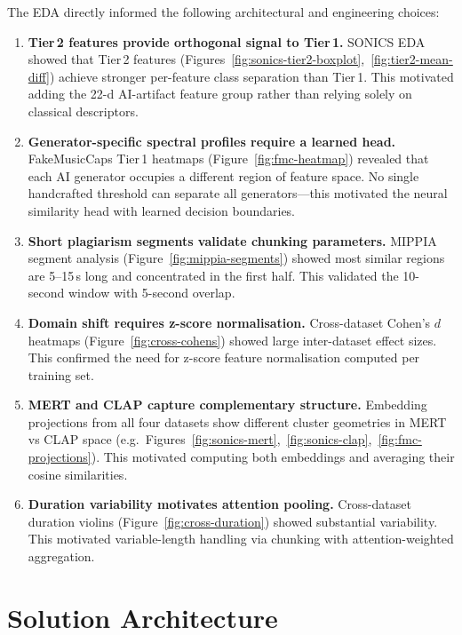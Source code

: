 \documentclass[11pt,a4paper]{article}
\begin{document}
The EDA directly informed the following architectural and engineering choices:

\begin{enumerate}[nosep]
  \item \textbf{Tier\,2 features provide orthogonal signal to Tier\,1.} SONICS EDA showed that Tier\,2 features (Figures~\ref{fig:sonics-tier2-boxplot},~\ref{fig:tier2-mean-diff}) achieve stronger per-feature class separation than Tier\,1. This motivated adding the 22-d AI-artifact feature group rather than relying solely on classical descriptors.
  \item \textbf{Generator-specific spectral profiles require a learned head.} FakeMusicCaps Tier\,1 heatmaps (Figure~\ref{fig:fmc-heatmap}) revealed that each AI generator occupies a different region of feature space. No single handcrafted threshold can separate all generators---this motivated the neural similarity head with learned decision boundaries.
  \item \textbf{Short plagiarism segments validate chunking parameters.} MIPPIA segment analysis (Figure~\ref{fig:mippia-segments}) showed most similar regions are 5--15\,s long and concentrated in the first half. This validated the 10-second window with 5-second overlap.
  \item \textbf{Domain shift requires z-score normalisation.} Cross-dataset Cohen's $d$ heatmaps (Figure~\ref{fig:cross-cohens}) showed large inter-dataset effect sizes. This confirmed the need for z-score feature normalisation computed per training set.
  \item \textbf{MERT and CLAP capture complementary structure.} Embedding projections from all four datasets show different cluster geometries in MERT vs CLAP space (e.g.\ Figures~\ref{fig:sonics-mert},~\ref{fig:sonics-clap},~\ref{fig:fmc-projections}). This motivated computing both embeddings and averaging their cosine similarities.
  \item \textbf{Duration variability motivates attention pooling.} Cross-dataset duration violins (Figure~\ref{fig:cross-duration}) showed substantial variability. This motivated variable-length handling via chunking with attention-weighted aggregation.
\end{enumerate}


\section{Solution Architecture}
\end{document}
